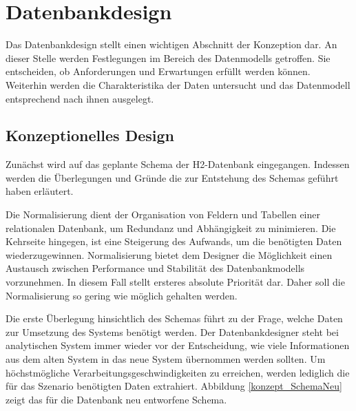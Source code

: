 \section{Datenbankdesign}

Das Datenbankdesign stellt einen wichtigen Abschnitt der Konzeption dar. An dieser Stelle werden Festlegungen im Bereich des Datenmodells getroffen. Sie entscheiden, ob Anforderungen und Erwartungen erfüllt werden können. Weiterhin werden die Charakteristika der Daten untersucht und das Datenmodell entsprechend nach ihnen ausgelegt.

\subsection{Konzeptionelles Design}

Zunächst wird auf das geplante Schema der H2-Datenbank eingegangen. Indessen werden die Überlegungen und Gründe die zur Entstehung des Schemas geführt haben erläutert. 

Die Normalisierung dient der Organisation von Feldern und Tabellen einer relationalen Datenbank, um Redundanz und Abhängigkeit zu minimieren. Die Kehrseite hingegen, ist eine Steigerung des Aufwands, um die benötigten Daten wiederzugewinnen. Normalisierung bietet dem Designer die Möglichkeit einen Austausch zwischen Performance und Stabilität des Datenbankmodells vorzunehmen. 
In diesem Fall stellt ersteres absolute Priorität dar. Daher soll die Normalisierung so gering wie möglich gehalten werden. 

Die erste Überlegung hinsichtlich des Schemas führt zu der Frage, welche Daten zur Umsetzung des Systems benötigt werden. Der Datenbankdesigner steht bei analytischen System immer wieder vor der Entscheidung, wie viele Informationen aus dem alten System in das neue System übernommen werden sollten. Um höchstmögliche Verarbeitungsgeschwindigkeiten zu erreichen, werden lediglich die für das Szenario benötigten Daten extrahiert. Abbildung \ref{konzept_SchemaNeu} zeigt das für die Datenbank neu entworfene Schema. 


